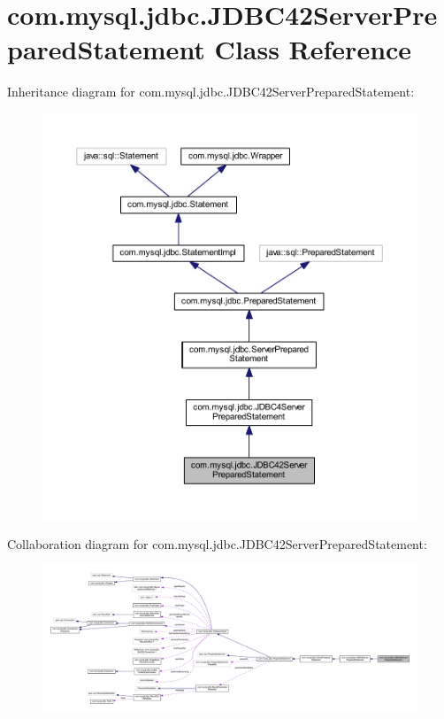 \hypertarget{classcom_1_1mysql_1_1jdbc_1_1_j_d_b_c42_server_prepared_statement}{}\section{com.\+mysql.\+jdbc.\+J\+D\+B\+C42\+Server\+Prepared\+Statement Class Reference}
\label{classcom_1_1mysql_1_1jdbc_1_1_j_d_b_c42_server_prepared_statement}


Inheritance diagram for com.\+mysql.\+jdbc.\+J\+D\+B\+C42\+Server\+Prepared\+Statement\+:
\nopagebreak
\begin{figure}[H]
\begin{center}
\leavevmode
\includegraphics[width=350pt]{classcom_1_1mysql_1_1jdbc_1_1_j_d_b_c42_server_prepared_statement__inherit__graph}
\end{center}
\end{figure}


Collaboration diagram for com.\+mysql.\+jdbc.\+J\+D\+B\+C42\+Server\+Prepared\+Statement\+:
\nopagebreak
\begin{figure}[H]
\begin{center}
\leavevmode
\includegraphics[width=350pt]{classcom_1_1mysql_1_1jdbc_1_1_j_d_b_c42_server_prepared_statement__coll__graph}
\end{center}
\end{figure}
